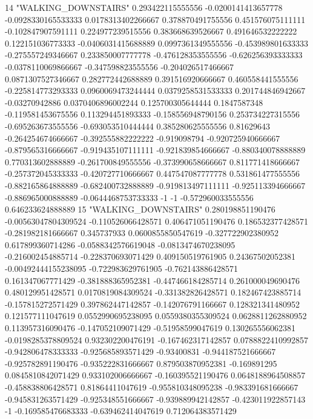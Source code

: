 14 "WALKING_DOWNSTAIRS" 0.293422115555556 -0.0200141413657778 -0.0928330165533333 0.0178313402266667 0.378870491755556 0.451576075111111 -0.102847907591111 0.224977239515556 0.383668639526667 0.491646532222222 0.122151036773333 -0.0406031415688889 0.0997361349555556 -0.453989801633333 -0.275557249346667 0.233850007777778 -0.476128353555556 -0.626256393333333 -0.0378110069866667 -0.347598823555556 -0.204026517466667 0.0871307527346667 0.282772442688889 0.391516920666667 0.460558441555556 -0.225814773293333 0.0960069473244444 0.0379258531533333 0.201744846942667 -0.03270942886 0.0370406896002244 0.125700305644444 0.1847587348 -0.119581453675556 0.113294451893333 -0.158556948790156 0.253734227315556 -0.695263673555556 -0.693053510444444 0.385280625555556 0.81629643 -0.264254674666667 -0.392555882222222 -0.919098794 -0.920725940666667 -0.879565316666667 -0.919435107111111 -0.921839854666667 -0.880340078888889 0.770313602888889 -0.261700849555556 -0.373990658666667 0.811771418666667 -0.257372045333333 -0.420727710666667 0.447547087777778 0.531861477555556 -0.882165864888889 -0.682400732888889 -0.919813497111111 -0.925113394666667 -0.886965000888889 -0.0644468753733333 -1 -1 -0.572960033555556 0.646233624888889
15 "WALKING_DOWNSTAIRS" 0.280198851190476 -0.00563047804309524 -0.110526066428571 0.406471051190476 0.186532377428571 -0.281982181666667 0.345737933 0.0600855850547619 -0.327722902380952 0.617899360714286 -0.0588342576619048 -0.0813474670238095 -0.216002454885714 -0.228370693071429 0.409150519761905 0.24367502052381 -0.00492444155238095 -0.722983629761905 -0.762143886428571 0.161347067771429 -0.381888365952381 -0.447466184285714 0.261000049690476 0.480129951428571 0.0170819084309524 -0.331382826428571 0.182467423885714 -0.157815272571429 0.397862447142857 -0.142076791166667 0.128321341480952 0.121577111047619 0.0552990695238095 0.0559380355309524 0.0628811262880952 0.113957316090476 -0.147052109071429 -0.51958599047619 0.130265556062381 -0.0198285378809524 0.932302200476191 -0.167462317142857 0.0788822410992857 -0.942806478333333 -0.925685893571429 -0.93400831 -0.944187521666667 -0.925782891190476 -0.935222831666667 0.879503870952381 -0.169891295 0.0845810842071429 0.933102006666667 -0.160395521190476 0.0648188964508857 -0.458838806428571 0.81864411047619 -0.955810348095238 -0.983391681666667 -0.945831263571429 -0.925348551666667 -0.939889942142857 -0.423011922857143 -1 -0.169585476683333 -0.639462414047619 0.712064383571429
